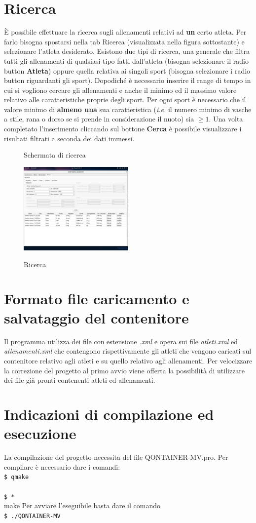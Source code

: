 \documentclass[10pt, a4paper]{article}
\newcommand{\shellcmd}[1]{\\\indent\indent\texttt{\footnotesize\$ #1}\\}
\begin{document}
\section{Ricerca}
È possibile effettuare la ricerca sugli allenamenti relativi ad \textbf{un} certo atleta. Per farlo bisogna spostarsi nella tab Ricerca (visualizzata nella figura sottostante) e selezionare l'atleta desiderato.
Esistono due tipi di ricerca, una generale che filtra tutti gli allenamenti 
di qualsiasi tipo fatti dall'atleta (bisogna selezionare il radio button \textbf{Atleta}) oppure quella relativa ai singoli sport (bisogna selezionare i radio button riguardanti gli sport).
Dopodiché è necessario inserire il range di tempo in cui si vogliono cercare gli allenamenti e anche il minimo ed il massimo valore relativo alle caratteristiche proprie degli sport.
Per ogni sport è necessario che il valore minimo di \textbf{almeno una} sua caratteristica (\emph{i.e.} il numero minimo di vasche a stile, rana o dorso se si prende in considerazione il nuoto) sia $\geq 1$.
Una volta completato l'inserimento cliccando sul bottone \textbf{Cerca} è possibile visualizzare i risultati filtrati a seconda dei dati immessi.

\begin{figure}[h]
    \caption{Schermata di ricerca}
    \centering
    \includegraphics[width=0.5\textwidth]{ricerca.png}
    \label{figure:gerarchiaDialog}
    \caption{Ricerca}
\end{figure}



\section{Formato file caricamento e salvataggio del contenitore}
Il programma utilizza dei file con estensione \emph{.xml} e opera sui file \emph{atleti.xml} ed \emph{allenamenti.xml}
che contengono rispettivamente gli atleti che vengono caricati sul contenitore relativo agli atleti e su quello 
relativo agli allenamenti. Per velocizzare la correzione del progetto al primo avvio viene offerta la possibilità di 
utilizzare dei file già pronti contenenti atleti ed allenamenti.

\section{Indicazioni di compilazione ed esecuzione}
La compilazione del progetto necessita del file QONTAINER-MV.pro.
Per compilare è necessario dare i comandi: \shellcmd{qmake}\shellcmd*{make}
Per avviare l'eseguibile basta dare il comando \shellcmd{./QONTAINER-MV}
\end{document}
